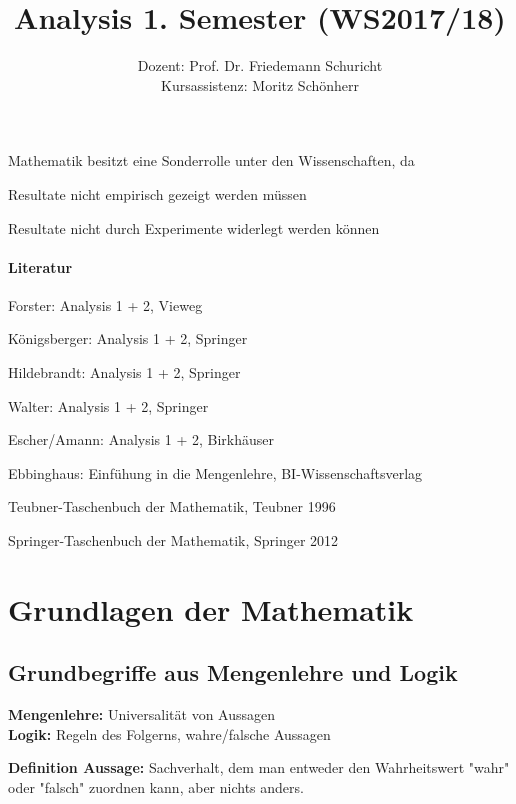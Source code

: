 \documentclass[11pt]{article}
\title{\textbf{Analysis 1. Semester (WS2017/18)}}
\author{Dozent: Prof. Dr. Friedemann Schuricht\\
		Kursassistenz: Moritz Sch\"onherr}
\date{}
\begin{document}
\maketitle
\renewcommand*{\arraystretch}{1.4}

\raggedright 
Mathematik besitzt eine Sonderrolle unter den Wissenschaften, da
\begin{compactitem}
	\item Resultate nicht empirisch gezeigt werden m\"ussen
	\item Resultate nicht durch Experimente widerlegt werden k\"onnen
\end{compactitem}

\paragraph{Literatur}
\begin{compactitem}
	\item Forster: Analysis 1 + 2, Vieweg
	\item K\"onigsberger: Analysis 1 + 2, Springer
	\item Hildebrandt: Analysis 1 + 2, Springer
	\item Walter: Analysis 1 + 2, Springer
	\item Escher/Amann: Analysis 1 + 2, Birkh\"auser
	\item Ebbinghaus: Einf\"uhung in die Mengenlehre, BI-Wissenschaftsverlag
	\item Teubner-Taschenbuch der Mathematik, Teubner 1996
	\item Springer-Taschenbuch der Mathematik, Springer 2012
\end{compactitem}

\section{Grundlagen der Mathematik}

	\subsection{Grundbegriffe aus Mengenlehre und Logik}

		\textbf{Mengenlehre:} Universalit\"at von Aussagen \\
		\textbf{Logik:} Regeln des Folgerns, wahre/falsche Aussagen

		\begin{framed}
			\textbf{Definition Aussage:} Sachverhalt, dem man entweder den Wahrheitswert "wahr" oder "falsch" 				zuordnen kann, aber nichts anders.
		\end{framed}
\end{document}
